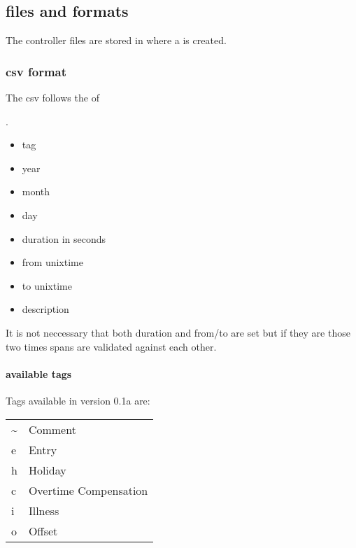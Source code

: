 \documentclass[letterpaper,10pt,english]{sphinxmanual}
\begin{document}
\subsection{files and formats}
\label{\detokenize{devmanual:files-and-formats}}
The controller files are stored in  where a  is created.


\subsubsection{csv format}
\label{\detokenize{devmanual:csv-format}}
The csv follows the  of  %
\begin{footnote}[1]\sphinxAtStartFootnote
{}
%
\end{footnote}.
\begin{itemize}
\item {} 
tag

\item {} 
year

\item {} 
month

\item {} 
day

\item {} 
duration in seconds

\item {} 
from unixtime

\item {} 
to unixtime

\item {} 
description

\end{itemize}

It is not neccessary that both duration and from/to are set but if they are those two times spans are validated against each other.


\paragraph{available tags}
\label{\detokenize{devmanual:available-tags}}
Tags available in version 0.1a are:


\begin{savenotes}\sphinxattablestart
\centering
\begin{tabulary}{\linewidth}[t]{|T|T|}
\hline
{}\relax &\relax \\
\hline
\textasciitilde{}
&
Comment
\\
\hline
e
&
Entry
\\
\hline
h
&
Holiday
\\
\hline
c
&
Overtime Compensation
\\
\hline
i
&
Illness
\\
\hline
o
&
Offset
\\
\hline
\end{tabulary}
\par
\sphinxattableend\end{savenotes}
\end{document}
